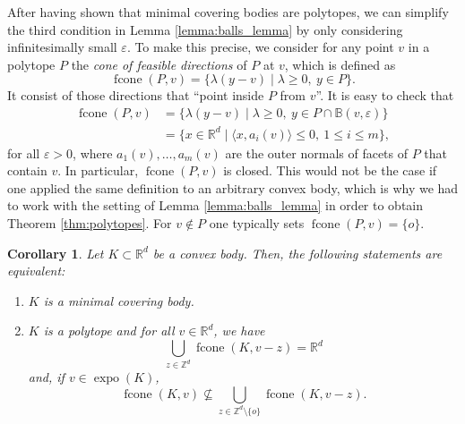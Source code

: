\documentclass[11pt, a4paper]{amsart}
\newcommand{\RR}{\mathbb{R}}
\newcommand{\ZZ}{\mathbb{Z}}
\newcommand{\ball}{\mathbb{B}}
\DeclareMathOperator{\expo}{expo}
\DeclareMathOperator{\fcone}{fcone}
\newcommand{\origin}{o}
\numberwithin{equation}{section}
\theoremstyle{plain}
\newtheorem{corollary}[theorem]{Corollary}
\begin{document}
After having shown that minimal covering bodies are polytopes, we can simplify the third condition in Lemma \ref{lemma:balls_lemma} by only considering infinitesimally small $\varepsilon$. To make this precise, we consider for any point $v$ in a polytope $P$ the \emph{cone of feasible directions} of $P$ at $v$, which is defined as
\begin{equation}
\label{eq:fcone}
\fcone(P,v) = \{\lambda(y-v) \;\vert\; \lambda \geq 0,~y\in P\}.
\end{equation}
It consist of those directions that ``point inside $P$ from $v$''. It is easy to check that
\begin{equation}
\label{eq:fcone_identities}
\begin{split}
\fcone(P,v) &= \{\lambda(y-v) \;\vert\; \lambda \geq 0,~y\in P \cap \ball(v,\varepsilon)\}\\ 
&= \{x\in\RR^d \; \vert\; \langle x,a_i(v)\rangle \leq 0,~1\leq i \leq m\},
\end{split}
\end{equation}
for all $\varepsilon> 0$, where $a_1(v),\dots,a_m(v)$ are the outer normals of facets of $P$ that contain $v$.
In particular, $\fcone(P,v)$ is closed. This would not be the case if one applied the same definition to an arbitrary convex body, which is why we had to work with the setting of Lemma \ref{lemma:balls_lemma} in order to obtain Theorem \ref{thm:polytopes}.
For $v\not\in P$ one typically sets $\fcone(P,v) = \{\origin\}$.  

\begin{corollary}\label{cor:fcone}
	Let $K\subset\RR^d$ be a convex body. Then, the following statements are equivalent:
	\begin{enumerate}
	\item $K$ is a minimal covering body.
	\item $K$ is a polytope and for all $v\in\RR^d$, we have
	\begin{equation}
	\label{eq:fcone_covering}
	\bigcup_{z\in\ZZ^d} \fcone(K, v-z) = \RR^d
	\end{equation}
	and, if $v\in\expo(K)$,
	\begin{equation}
	\label{eq:fcone_condition}
	\fcone(K,v)\not\subseteq\bigcup_{z\in\ZZ^d\setminus\{\origin\}} \fcone(K,v-z).
	\end{equation}
	\end{enumerate}
\end{corollary}
\end{document}
